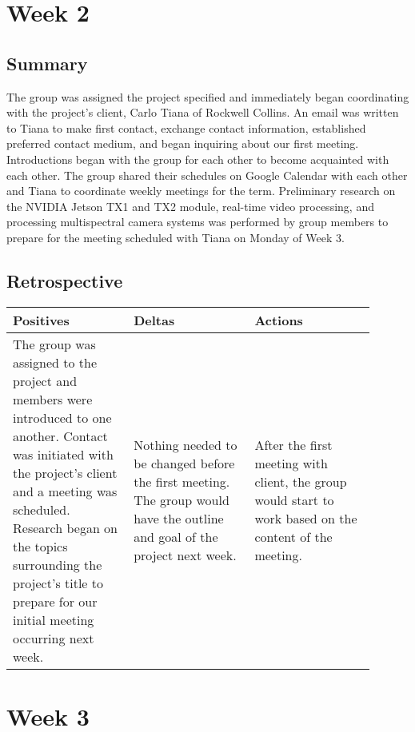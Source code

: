 \documentclass[letterpaper,10pt,serif,draftclsnofoot,onecolumn,compsoc,titlepage]{IEEEtran}
\begin{document}
\section{Week 2}

\subsection{Summary}

The group was assigned the project specified and immediately began coordinating 
with the project's client, Carlo Tiana of Rockwell Collins. 
An email was written to Tiana to make first contact, exchange contact 
information,
established preferred contact medium, and began inquiring about our first meeting.
Introductions began with the group for each other to become acquainted with 
each other. 
The group shared their schedules on Google Calendar with each other and Tiana 
to coordinate weekly meetings for the term. 
Preliminary research on the NVIDIA Jetson TX1 and TX2 module, real-time video 
processing, and processing multispectral camera systems was performed by group members 
to prepare for the meeting scheduled with Tiana on Monday of Week 3. \\


\subsection{Retrospective}

\begin{tabular}{|p{0.3\linewidth}|p{0.3\linewidth}|p{0.3\linewidth}|}
   \hline
   \textbf{Positives} & \textbf{Deltas} & \textbf{Actions}\\ 
   \hline
   The group was assigned to the project and members were introduced to one another. 
   Contact was initiated with the project's client and a meeting was scheduled. 
   Research began on the topics surrounding the project's title to prepare 
   for our initial meeting occurring next week. 
   & 
   Nothing needed to be changed before the first meeting. The group would have the outline 
   and goal of the project next week. 
   & 
   After the first meeting with client, the group would start to work based on the content 
   of the meeting. \\
   \hline
\end{tabular}


\section{Week 3}
\end{document}
